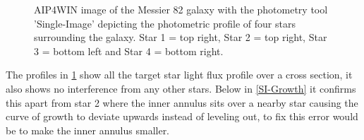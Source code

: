 \documentclass[12pt]{article}
\begin{document}
\begin{figure}[H]
\begin{multicols}{2}
\end{multicols}
\caption{AIP4WIN image of the Messier 82 galaxy with the photometry tool 'Single-Image' depicting the photometric profile of four stars surrounding the galaxy. Star 1 = top right, Star 2 = top right, Star 3 = bottom left and Star 4 = bottom right.}
\label{SI-Profile}
\end{figure}

The profiles in \cref{SI-Profile} show all the target star light flux profile over a cross section, it also shows no interference from any other stars. Below in \cref{SI-Growth} it confirms this apart from star 2 where the inner annulus sits over a nearby star causing the curve of growth to deviate upwards instead of leveling out, to fix this error would be to make the inner annulus smaller. \\ 
\end{document}
